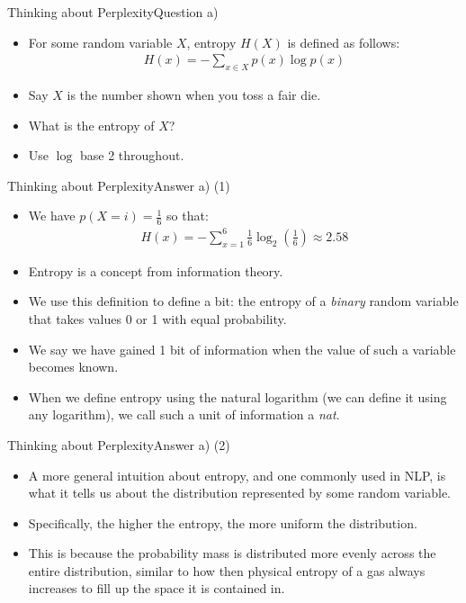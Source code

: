 \documentclass[t]{beamer}
\begin{document}
\begin{frame}{Thinking about Perplexity}{Question a)}
    \begin{itemize}
        \item For some random variable $X$, entropy $H(X)$ is defined as
              follows:
              \begin{align}
                  H(x) = -\sum_{x\in X} p(x)\log p(x)
              \end{align}
        \item Say $X$ is the number shown when you toss a fair die.
        \item What is the entropy of $X$?
        \item Use $\log$ base 2 throughout.
    \end{itemize}
\end{frame}

\begin{frame}{Thinking about Perplexity}{Answer a) (1)}
    \begin{itemize}
        \item We have $p(X = i) = \frac{1}{6}$ so that:
              \begin{align*}
                  H(x) = -\sum_{x=1}^6 \frac{1}{6}\log_2\left(\frac{1}{6}\right) \approx 2.58
              \end{align*}
        \item Entropy is a concept from information theory.
        \item We use this definition to define a bit: the entropy of a
              \emph{binary} random variable that takes values 0 or 1 with equal
              probability.
        \item We say we have gained 1 bit of information when the value of such
              a variable becomes known.
        \item When we define entropy using the natural logarithm (we can define it
              using any logarithm), we call such a unit of information a \emph{nat}.
    \end{itemize}
\end{frame}

\begin{frame}{Thinking about Perplexity}{Answer a) (2)}
    \begin{itemize}
        \item A more general intuition about entropy, and one commonly used in
              NLP, is what it tells us about the distribution represented by
              some random variable.
        \item Specifically, the higher the entropy, the more uniform the
              distribution.
        \item This is because the probability mass is distributed more evenly
              across the entire distribution, similar to how then physical
              entropy of a gas always increases to fill up the space it is
              contained in.
    \end{itemize}
\end{frame}
\end{document}
